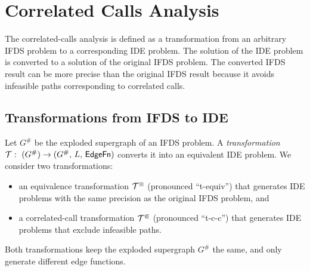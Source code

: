 \section{Correlated Calls Analysis}\label{chapter:cca}
The correlated-calls analysis is defined as a transformation from an arbitrary IFDS problem to a corresponding IDE problem. The solution of the IDE problem is converted to a solution of the original IFDS problem. The converted IFDS result can be more precise than the original IFDS result because it avoids infeasible paths corresponding to correlated calls.


\subsection{Transformations from IFDS to IDE}\label{seq:transIfdsIde}


Let $G^\#$ be the exploded supergraph of an IFDS problem. A \emph{transformation}
$\mathcal T:\ (G^\#)\to (G^\#,\,L,\,\textsf{EdgeFn})$
converts it into an equivalent IDE problem. We consider two transformations:
\begin{itemize}
	\item an equivalence transformation $\mathcal T^\equiv$ (pronounced ``t-equiv'') that generates IDE problems with the same precision as the original IFDS problem, and
  \item a correlated-call transformation $\mathcal T^\Subset$ (pronounced ``t-c-c'') that generates IDE problems that exclude infeasible paths.
\end{itemize}
Both transformations keep the exploded supergraph $G^\#$ the same, and only generate different edge functions.

